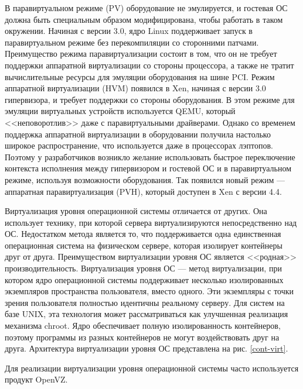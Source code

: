 В паравиртуальном режиме (PV) оборудование не эмулируется, и гостевая ОС должна быть специальным образом модифицирована, чтобы работать в таком окружении.
Начиная с версии 3.0, ядро Linux поддерживает запуск в паравиртуальном режиме без перекомпиляции со сторонними патчами.
Преимущество режима паравиртуализации состоит в том, что он не требует поддержки аппаратной виртуализации со стороны процессора, а также не тратит вычислительные ресурсы для эмуляции оборудования на шине PCI.
Режим аппаратной виртуализации (HVM) появился в Xen, начиная с версии 3.0 гипервизора, и требует поддержки со стороны оборудования.
В этом режиме для эмуляции виртуальных устройств используется QEMU, который <<неповоротлив>> даже с паравиртуальными драйверами.
Однако со временем поддержка аппаратной виртуализации в оборудовании получила настолько широкое распространение, что используется даже в процессорах лэптопов.
Поэтому у разработчиков возникло желание использовать быстрое переключение контекста исполнения между гипервизором и гостевой ОС и в паравиртуальном режиме, используя возможности оборудования.
Так появился новый режим --- аппаратная паравиртуализация (PVH), который доступен в Xen с версии 4.4.

Виртуализация уровня операционной системы отличается от других.
Она использует технику, при которой сервера виртуализируются непосредственно над ОС.
Недостатком метода является то, что поддерживается одна единственная операционная система на физическом сервере, которая изолирует контейнеры друг от друга.
Преимуществом виртуализации уровня ОС является <<родная>> производительность.
Виртуализация уровня ОС --- метод виртуализации, при котором ядро операционной системы поддерживает несколько изолированных экземпляров пространства пользователя, вместо одного.
Эти экземпляры с точки зрения пользователя полностью идентичны реальному серверу.
Для систем на базе UNIX, эта технология может рассматриваться как улучшенная реализация механизма chroot.
Ядро обеспечивает полную изолированность контейнеров, поэтому программы из разных контейнеров не могут воздействовать друг на друга.
Архитектура виртуализации уровня ОС представлена на рис. \ref{cont-virt}.

Для реализации виртуализации уровня операционной системы часто используется продукт OpenVZ.

